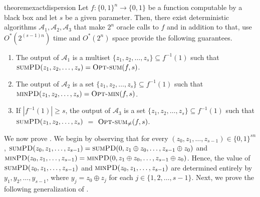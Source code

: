 \documentclass[11pt, letterpaper]{article}
\theoremstyle{definition}
\newcommand{\Q}[1]{\{0,1\}^{#1}}
\newcommand{\PD}{\textsc{minPD}}
\newcommand{\SPD}{\textsc{sumPD}}
\newcommand{\opts}{\textsc{Opt-sum}}
\newcommand{\optm}{\textsc{Opt-min}}
\begin{document}
\begin{restatable}{theorem}{exactdispersion}\label{thm:exactdisp}
	Let $f: \Q{n} \to \{0,1\}$ be a function computable by a black box and let $s$ be a given parameter. Then, there exist deterministic algorithms $\mathcal{A}_1, \mathcal{A}_2, \mathcal{A}_3$ that make $2^n$ oracle calls to $f$ and in addition to that, use $O^*(2^{(s-1)n})$ time and $O^*(2^n)$ space provide the following guarantees.
 \sloppy
 \begin{enumerate}
     \item The output of $\mathcal{A}_1$ is a multiset $\{z_1, z_2, \dots, z_s\} \subseteq f^{-1}(1)$ such that $\SPD(z_1, z_2, \dots, z_s) = \opts(f,s)$. 
     \item The output of $\mathcal{A}_2$ is a set $\{z_1, z_2, \dots, z_s \} \subseteq f^{-1}(1)$ such that $\PD(z_1, z_2, \dots, z_s) = \optm(f,s)$. 
     \item If $|f^{-1}(1)| \geq s$, the output of $\mathcal{A}_3$ is a set $\{z_1, z_2, \dots, z_s \} \subseteq f^{-1}(1)$ such that $\SPD(z_1, z_2, \dots, z_s)$ $ =$ $\opts_{\neq}(f,s)$. 
 \end{enumerate}
\end{restatable}

We now prove . We begin by observing that for every $(z_0, z_1, \dots, z_{s-1}) \in \Q{sn}$, $\SPD(z_0, z_1, \dots, z_{s-1})=\SPD(0, z_1 \oplus z_0, \dots, z_{s-1} \oplus z_0)$ and $\PD(z_0, z_1, \dots, z_{s-1})=\PD(0, z_1 \oplus z_0, \dots, z_{s-1} \oplus z_0)$. Hence, the value of $\SPD(z_0, z_1, \dots, z_{s-1})$ and $\PD(z_0, z_1, \dots, z_{s-1})$ are determined entirely by $y_1, y_2, \dots, y_{s-1}$, where $y_j=z_0 \oplus z_j$ for each $j \in \{1,2,\dots, s-1\}$. Next, we prove the following generalization of . 
\end{document}
